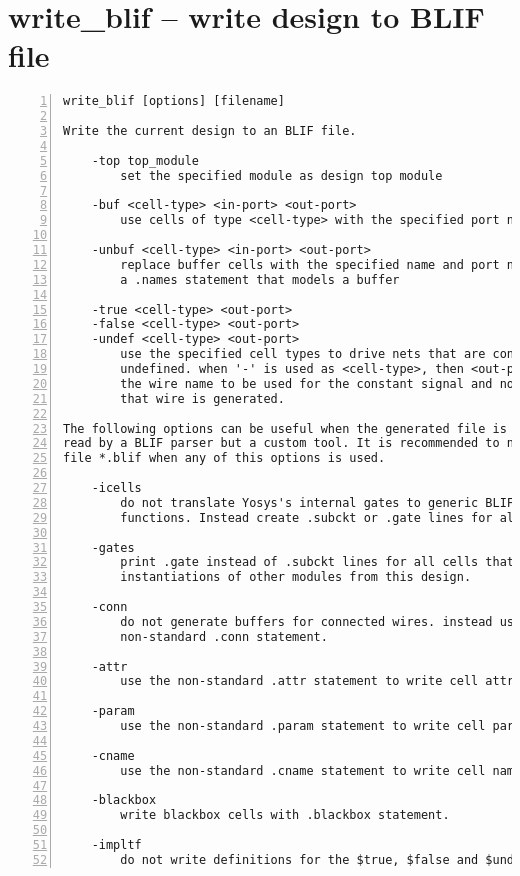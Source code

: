 \section{write\_blif -- write design to BLIF file}
\label{cmd:write_blif}
\begin{lstlisting}[numbers=left,frame=single]
    write_blif [options] [filename]

Write the current design to an BLIF file.

    -top top_module
        set the specified module as design top module

    -buf <cell-type> <in-port> <out-port>
        use cells of type <cell-type> with the specified port names for buffers

    -unbuf <cell-type> <in-port> <out-port>
        replace buffer cells with the specified name and port names with
        a .names statement that models a buffer

    -true <cell-type> <out-port>
    -false <cell-type> <out-port>
    -undef <cell-type> <out-port>
        use the specified cell types to drive nets that are constant 1, 0, or
        undefined. when '-' is used as <cell-type>, then <out-port> specifies
        the wire name to be used for the constant signal and no cell driving
        that wire is generated.

The following options can be useful when the generated file is not going to be
read by a BLIF parser but a custom tool. It is recommended to not name the output
file *.blif when any of this options is used.

    -icells
        do not translate Yosys's internal gates to generic BLIF logic
        functions. Instead create .subckt or .gate lines for all cells.

    -gates
        print .gate instead of .subckt lines for all cells that are not
        instantiations of other modules from this design.

    -conn
        do not generate buffers for connected wires. instead use the
        non-standard .conn statement.

    -attr
        use the non-standard .attr statement to write cell attributes

    -param
        use the non-standard .param statement to write cell parameters

    -cname
        use the non-standard .cname statement to write cell names

    -blackbox
        write blackbox cells with .blackbox statement.

    -impltf
        do not write definitions for the $true, $false and $undef wires.
\end{lstlisting}

